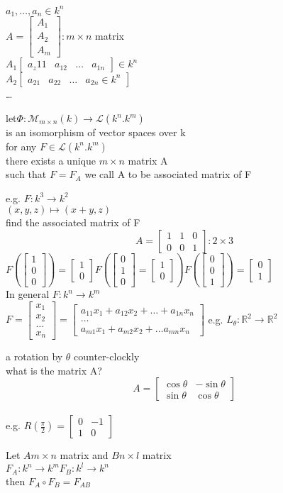 \documentclass{article}
\newcommand{\R}{\mathbb{R}}
\newcommand\m[1]{\begin{bmatrix}#1\end{bmatrix}}
\newcommand{\mn}{m \times n}
\newenvironment{lemma}[2][Lemma]{\begin{trivlist}
\item[\hskip \labelsep {\bfseries #1}\hskip \labelsep {\bfseries #2.}]}{\end{trivlist}}
\begin{document}
$a_1,\dots,a_n \in k^n$
\\$A=\m{A_1\\A_2\\A_m}: \mn$ matrix\\
$A_1\m{a_z{11}&a_{12}&\dots&a_{1n}} \in k^n$\\
$A_2\m{a_{21}&a_{22}&\dots&a_{2n} \in k^n}$\\
\dots
\\
\begin{theorem}
    [A+B] let$ \Phi:\mathcal{M}_{\mn}(k) \to \mathcal{L}(k^n.k^m)$\\
     is an isomorphism of vector spaces over k\\
     for any $F \in \mathcal{L}(k^n.k^m)$\\
     there exists a unique $\mn$ matrix A\\
     such that $F=F_A$ we call A to be associated matrix of F
\end{theorem}
e.g. $F:k^3\to k^2$
\\$(x,y,z) \mapsto (x+y,z)$\\
find the associated matrix of F\\
$$A=\m{1&1&0\\0&0&1}: 2\times 3$$
$F(\m{1\\0\\0})=\m{1\\0} F(\m{0\\1\\0}=\m{1\\0}) F(\m{0\\0\\1})=\m{0\\1}$\\
In general $F:k^n \to k^m$\\
$F=\m{x_1\\x_2\\\dots\\ x_n}=\m{a_{11}x_1+a_{12}x_2+\dots+a_{1n}x_n\\\dots\\a_{m1}x_1+a_{m2}x_2+\dots a_{mn}x_n}$
e.g.  $L_\theta: \R^2 \to \R^2$

a rotation by $\theta $ counter-clockly\\ 
what is the matrix A?\\
$$A=\m{\cos{\theta} &-\sin{\theta}\\\sin{\theta} &\cos{\theta}}$$\\
e.g. $R(\frac{\pi}{2})=\m{0&-1\\1&0}$
\begin{lemma}
    {} Let $A \mn$ matrix and $B n\times l$ matrix \\
    $F_A:k^n \to k^m$$F_B: k^l\to k^n$\\
    then $F_A \circ F_B= F_{AB}$\\
    
    
\end{lemma}
\end{document}
